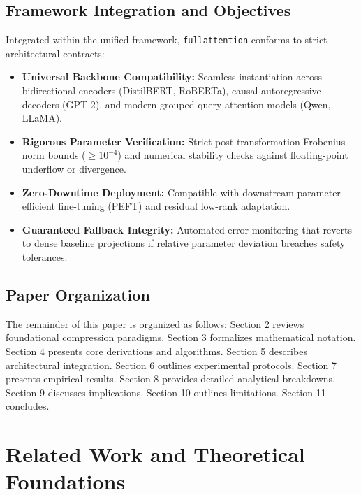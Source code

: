 {\subsection{Framework Integration and Objectives}
Integrated within the unified framework, \texttt{fullattention} conforms to strict architectural contracts:
\begin{itemize}
\item \textbf{Universal Backbone Compatibility:} Seamless instantiation across bidirectional encoders (DistilBERT, RoBERTa), causal autoregressive decoders (GPT-2), and modern grouped-query attention models (Qwen, LLaMA).
\item \textbf{Rigorous Parameter Verification:} Strict post-transformation Frobenius norm bounds ($\ge 10^{-4}$) and numerical stability checks against floating-point underflow or divergence.
\item \textbf{Zero-Downtime Deployment:} Compatible with downstream parameter-efficient fine-tuning (PEFT) and residual low-rank adaptation.
\item \textbf{Guaranteed Fallback Integrity:} Automated error monitoring that reverts to dense baseline projections if relative parameter deviation breaches safety tolerances.
\end{itemize}

\subsection{Paper Organization}
The remainder of this paper is organized as follows: Section 2 reviews foundational compression paradigms. Section 3 formalizes mathematical notation. Section 4 presents core derivations and algorithms. Section 5 describes architectural integration. Section 6 outlines experimental protocols. Section 7 presents empirical results. Section 8 provides detailed analytical breakdowns. Section 9 discusses implications. Section 10 outlines limitations. Section 11 concludes.


\section{Related Work and Theoretical Foundations}

}
